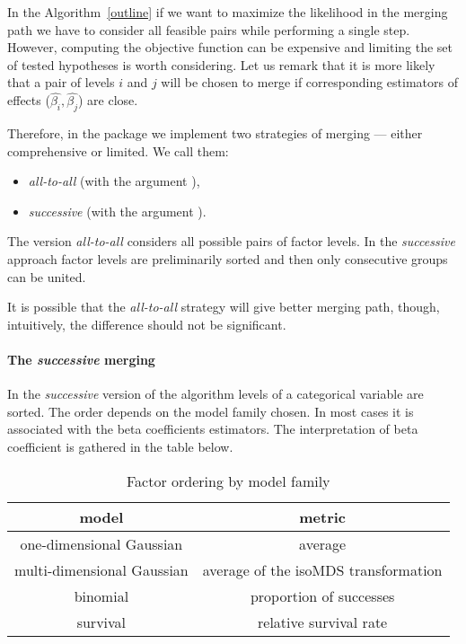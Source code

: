 In the Algorithm~\ref{outline} if we want to maximize the likelihood in the merging path we have to consider all feasible pairs while performing a single step. However, 
computing the objective function can be expensive and limiting the set of tested hypotheses is worth considering. Let us remark that it is more likely that a pair of levels $i$ and $j$ will be chosen to merge if corresponding estimators of effects ($\hat{\beta_i}, \hat{\beta_j}$) are close.


Therefore, in the package we implement two strategies of merging --- either comprehensive or limited. We call them:

\begin{itemize}
\item \emph{all-to-all} (with the argument ),
\item \emph{successive} (with the argument ).

\end{itemize}

The version \emph{all-to-all} considers all possible pairs of factor levels. In the \emph{successive} approach factor levels are preliminarily sorted and then only consecutive groups can be united. 

It is possible that the \emph{all-to-all} strategy will give better merging path, though, intuitively, the difference should not be significant.



\paragraph{The \emph{successive} merging}

In the \emph{successive} version of the algorithm levels of a categorical variable are sorted. The order depends on the model family chosen. In most cases it is associated with the beta coefficients estimators. The interpretation of beta coefficient is gathered in the table below.

\begin{table}[H]
\centering \begin{tabular}[t]{c|c}
\hline \textbf{model} & \textbf{metric} \\
\hline one-dimensional Gaussian & average \\
\hline multi-dimensional Gaussian & average of the isoMDS transformation \\
\hline binomial & proportion of successes \\
\hline survival & relative survival rate \\
\hline 

\end{tabular}
\caption{\label{tab:}Factor ordering by model family}

\end{table}

